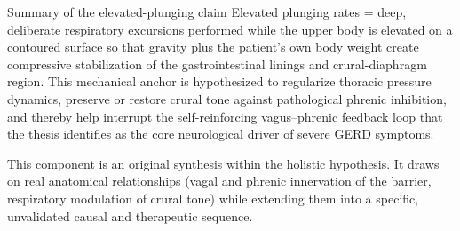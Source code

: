 Summary of the elevated-plunging claim
Elevated plunging rates = deep, deliberate respiratory excursions performed while the upper body is elevated on a contoured surface so that gravity plus the patient’s own body weight create compressive stabilization of the gastrointestinal linings and crural-diaphragm region. This mechanical anchor is hypothesized to regularize thoracic pressure dynamics, preserve or restore crural tone against pathological phrenic inhibition, and thereby help interrupt the self-reinforcing vagus–phrenic feedback loop that the thesis identifies as the core neurological driver of severe GERD symptoms.

This component is an original synthesis within the holistic hypothesis. It draws on real anatomical relationships (vagal and phrenic innervation of the barrier, respiratory modulation of crural tone) while extending them into a specific, unvalidated causal and therapeutic sequence.

